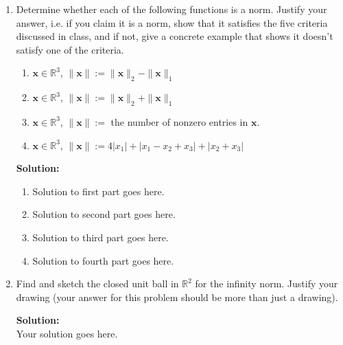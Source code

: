 \documentclass[]{article}
\newcommand{\R}{\mathbb{R}}
\newcommand{\solution}{\vskip 0.5cm \textbf{\large Solution:} \\}
\begin{document}
\begin{enumerate}[resume]
	
	\item Determine whether each of the following functions is a norm. Justify your answer, i.e. if you claim it is a norm, show that it satisfies the five criteria discussed in class, and if not, give a concrete example that shows it doesn't satisfy one of the criteria.
	
	\begin{enumerate}
		\item $\bm{x}\in\R^3$, $\|\bm{x}\| := \|\bm{x}\|_2-\|\bm{x}\|_1$
		\item $\bm{x}\in\R^3$, $\|\bm{x}\| := \|\bm{x}\|_2 + \|\bm{x}\|_1$
		\item $\bm{x}\in\R^3$, $\|\bm{x}\| := $ the number of nonzero entries in $\bm{x}$.
		\item $\bm{x}\in\R^3$, $\|\bm{x}\| := 4|x_1| + |x_1-x_2+x_3| + |x_2+x_3|$
	\end{enumerate}

	\solution
	\begin{enumerate}
		\item Solution to first part goes here.
		\item Solution to second part goes here.
		\item Solution to third part goes here.
		\item Solution to fourth part goes here.
	\end{enumerate}

	\item Find and sketch the closed unit ball in $\R^2$ for the infinity norm. Justify your drawing (your answer for this problem should be more than just a drawing).

	\solution
	Your solution goes here.

\end{enumerate}
\end{document}

